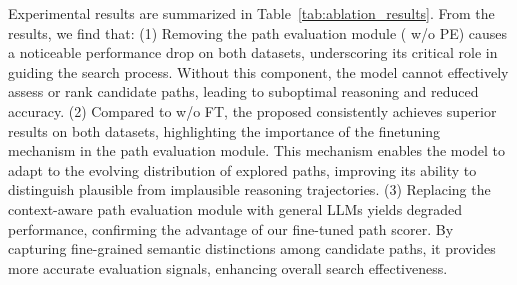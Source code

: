 Experimental results are summarized in Table~\ref{tab:ablation_results}. From the results, we find that:
(1) Removing the path evaluation module (\method{} w/o PE) causes a noticeable performance drop on both datasets, underscoring its critical role in guiding the search process. Without this component, the model cannot effectively assess or rank candidate paths, leading to suboptimal reasoning and reduced accuracy.
(2) Compared to \method{} w/o FT, the proposed \method{} consistently achieves superior results on both datasets, highlighting the importance of the finetuning mechanism in the path evaluation module. This mechanism enables the model to adapt to the evolving distribution of explored paths, improving its ability to distinguish plausible from implausible reasoning trajectories.
(3) Replacing the context-aware path evaluation module with general LLMs yields degraded performance, confirming the advantage of our fine-tuned path scorer. By capturing fine-grained semantic distinctions among candidate paths, it provides more accurate evaluation signals, enhancing overall search effectiveness.











